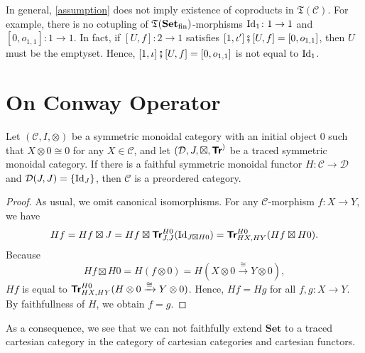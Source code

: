 In general, \eqref{assumption} does not imply existence of
coproducts in $\mathfrak{T}(\mathcal{C})$. For example,
there is no cotupling of $\mathfrak{T}(\mathbf{Set}_{\mathrm{fin}})$-morphisms
$\mbox{\normalfont Id}_{1} \colon 1 \to 1$ and $[0,o_{1,1}] \colon 1 \to 1$.
In fact, if $[U,f] \colon 2 \to 1$ satisfies
$[1,\iota'] \fatsemi [U,f] = [0,o_{1,1}]$, then
$U$ must be the emptyset. Hence,
$[1,\iota] \fatsemi [U,f] = [0,o_{1,1}]$ is not
equal to $\mbox{\normalfont Id}_{1}$.

\newpage
\appendix

\section{On Conway Operator}


\begin{proposition}\label{prop:emb0}
  Let $(\mathcal{C},I,\otimes)$ be a symmetric monoidal category
  with an initial object $0$ such that $X \otimes 0 \cong 0$ for
  any $X \in \mathcal{C}$, and let $(\mathcal{D},J,\boxtimes,{\normalfont\textsf{\textbf{Tr}}}^{)}$
  be a traced symmetric monoidal category. If there is a faithful
  symmetric monoidal functor $H \colon \mathcal{C} \to \mathcal{D}$
  and $\mathcal{D}(J,J) = \{\mbox{\normalfont Id}_{J}\}$, then $\mathcal{C}$ is a
  preordered category.
\end{proposition}
\begin{proof}
  As usual, we omit canonical isomorphisms.
  For any $\mathcal{C}$-morphism $f \colon X \to Y$, we have
  \begin{equation*}
    Hf = Hf \boxtimes J
       = Hf \boxtimes {\normalfont\textsf{\textbf{Tr}}}^{H0}_{J,J} (\mbox{\normalfont Id}_{J \boxtimes H0})
       = {\normalfont\textsf{\textbf{Tr}}}^{H0}_{HX,HY}(Hf \boxtimes H0).
  \end{equation*}
  Because
  \begin{equation*}
    Hf \boxtimes H0 = H(f \otimes 0)
    = H(X \otimes 0 \xrightarrow{\cong} Y \otimes 0),
  \end{equation*}
  $Hf$ is equal to
  ${\normalfont\textsf{\textbf{Tr}}}^{H0}_{HX,HY}(H \otimes 0 \xrightarrow{\cong} Y \otimes 0)$.
  Hence, $Hf = Hg$ for all $f,g \colon X \to Y$. By faithfullness of $H$,
  we obtain $f = g$.
\end{proof}
As a consequence, we see that we can not faithfully extend
$\mathbf{Set}$ to a traced cartesian category in the category of
cartesian categories and cartesian functors.


